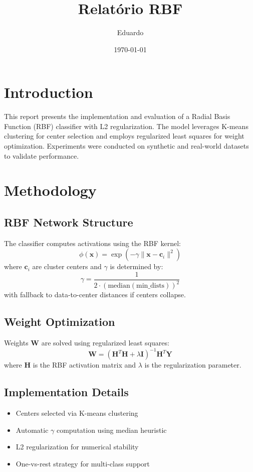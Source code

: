 \documentclass[a4paper,12pt]{article}
\begin{document}
\title{Relatório RBF}
\author{Eduardo}
\date{\today}
\maketitle

\section*{Introduction}
This report presents the implementation and evaluation of a Radial Basis Function (RBF) classifier with L2 regularization. The model leverages K-means clustering for center selection and employs regularized least squares for weight optimization. Experiments were conducted on synthetic and real-world datasets to validate performance.

\section*{Methodology}
\subsection*{RBF Network Structure}
The classifier computes activations using the RBF kernel:
\begin{equation}
  \phi(\mathbf{x}) = \exp(-\gamma \|\mathbf{x} - \mathbf{c}_i\|^2)
\end{equation}
where \(\mathbf{c}_i\) are cluster centers and \(\gamma\) is determined by:
\begin{equation}
  \gamma = \frac{1}{2 \cdot (\text{median}(\text{min\_dists}))^2}
\end{equation}
with fallback to data-to-center distances if centers collapse.

\subsection*{Weight Optimization}
Weights \(\mathbf{W}\) are solved using regularized least squares:
\begin{equation}
  \mathbf{W} = (\mathbf{H}^T\mathbf{H} + \lambda \mathbf{I})^{-1}\mathbf{H}^T\mathbf{Y}
\end{equation}
where \(\mathbf{H}\) is the RBF activation matrix and \(\lambda\) is the regularization parameter.

\subsection*{Implementation Details}
\begin{itemize}
  \item Centers selected via K-means clustering
  \item Automatic \(\gamma\) computation using median heuristic
  \item L2 regularization for numerical stability
  \item One-vs-rest strategy for multi-class support
\end{itemize}
\end{document}
